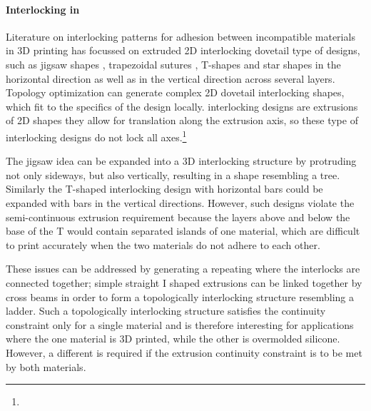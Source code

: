 

\paragraph{Interlocking in }

Literature on interlocking patterns for adhesion between incompatible materials in  3D printing has focussed on extruded 2D interlocking dovetail type of designs,
such as jigsaw shapes \cite{malik2017}, trapezoidal sutures \cite{Li2013}, T-shapes\cite{Ribeiro2019,mustafa2021development} and star shapes\cite{Wang2021} in the horizontal direction
as well as in the vertical direction across several layers\cite{debora2020}.
Topology optimization can generate complex 2D dovetail interlocking shapes, which fit to the specifics of the design locally\cite{aharoni2021}.
 interlocking designs are extrusions of 2D shapes they allow for translation along the extrusion axis, so these type of interlocking designs do not lock all axes.\footnote{}

The jigsaw idea can be expanded into a 3D interlocking structure by protruding not only sideways, but also vertically, resulting in a shape resembling a tree\cite{gouker2006manufacturing}.
Similarly the T-shaped interlocking design with horizontal bars could be expanded with bars in the vertical directions.
However, such designs violate the semi-continuous extrusion requirement because the layers above and below the base of the T would contain separated islands of one material, 
which are difficult to print accurately when the two materials do not adhere to each other.

These issues can be addressed by generating a repeating  where the interlocks are connected together;
simple straight I shaped extrusions can be linked together by cross beams in order to form a topologically interlocking structure resembling a ladder\cite{Rossing2020}.
Such a topologically interlocking structure satisfies the continuity constraint only for a single material and is therefore interesting for applications where the one material is 3D printed, while the other is overmolded silicone.
However, a different  is required if the extrusion continuity constraint is to be met by both materials.

